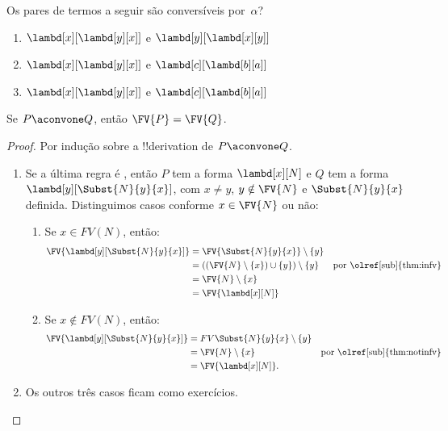 \documentclass[../../../include/open-logic-section]{subfiles}
\begin{document}
\begin{prob}
  Os pares de termos a seguir são conversíveis por~$\alpha$?
  \begin{enumerate}
  \item $\lambd[x][\lambd[y][x]]$ e $\lambd[y][\lambd[x][y]]$
  \item $\lambd[x][\lambd[y][x]]$ e $\lambd[c][\lambd[b][a]]$
  \item $\lambd[x][\lambd[y][x]]$ e $\lambd[c][\lambd[b][a]]$
  \end{enumerate}
\end{prob}

\begin{lem}
  Se $P \aconvone Q$, então $\FV{P} = \FV{Q}$.
\end{lem}

\begin{proof}
  Por indução sobre a !!{derivation} de $P \aconvone Q$.
  \begin{enumerate}
  \item Se a última regra é , então $P$ tem a forma
    $\lambd[x][N]$ e $Q$ tem a forma $\lambd[y][\Subst{N}{y}{x}]$, com
    $x \neq y$, $y \notin \FV{N}$ e $\Subst{N}{y}{x}$ definida. Distinguimos
    casos conforme $x \in \FV{N}$ ou não:
    \begin{enumerate}
    \item Se $x \in FV(N)$, então:
      \begin{align*}
        \FV{\lambd[y][\Subst{N}{y}{x}]} &=
        \FV{\Subst{N}{y}{x}} \setminus \{y\} \\
        & = ((\FV{N} \setminus \{x\}) \cup \{y\}) \setminus \{y\}
         && \text{por \olref[sub]{thm:infv}} \\
        & = \FV{N} \setminus \{x\} \\
        & = \FV{\lambd[x][N]}
      \end{align*}
    \item Se $x \notin FV(N)$, então:
      \begin{align*}
        \FV{\lambd[y][\Subst{N}{y}{x}]}
        & = FV{\Subst{N}{y}{x}} \setminus \{y\} \\
        & = \FV{N} \setminus \{x\}
         && \text{por \olref[sub]{thm:notinfv}} \\
        & = \FV{\lambd[x][N]}.
      \end{align*}
    \end{enumerate}
  \item Os outros três casos ficam como exercícios.
  \end{enumerate}
\end{proof}
\end{document}
